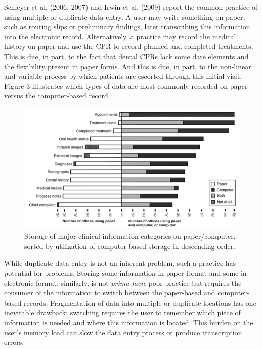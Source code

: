 \documentclass[11pt]{article}
\begin{document}
Schleyer et al. (2006, 2007) and Irwin et al. (2009) report the common practice of using multiple or duplicate data entry. A user may write something on paper, such as routing slips or preliminary findings, later transcribing this information into the electronic record. Alternatively, a practice may record the medical history on paper and use the CPR to record planned and completed treatments. This is due, in part, to the fact that dental CPRs lack some date elements and the flexibility present in paper forms.\cite{Schleyer2007A-Qualitative-I} And this is due, in part, to the non-linear and variable process by which patients are escorted through this initial visit. Figure 3 illustrates which types of data are most commonly recorded on paper versus the computer-based record.\label{fig:3}
\begin{figure}[!b]
\begin{center}
\includegraphics[width=\textwidth]{papervscomp.jpg}
\end{center}
\caption{Storage of major clinical information categories on paper/computer, sorted by utilization of computer-based storage in descending order.\cite{Schleyer2007A-Qualitative-I}}
\end{figure}
While duplicate data entry is not an inherent problem, such a practice has potential for problems. Storing some information in paper format and some in electronic format, similarly, is not \emph{prima facie} poor practice but requires the consumer of the information to switch between the paper-based and computer-based records. Fragmentation of data into multiple or duplicate locations has one inevitable drawback: switching requires the user to remember which piece of information is needed and where this information is located. This burden on the user's memory load can slow the data entry process or produce transcription errors.\cite{Salvucci2009Toward-a-unifie}
\end{document}
